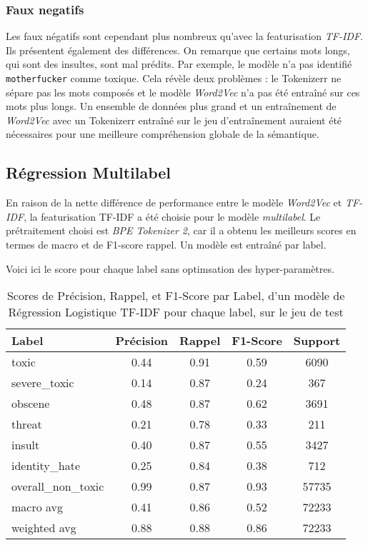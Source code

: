 \subsubsection{Faux negatifs}
Les faux négatifs sont cependant plus nombreux qu'avec la featurisation \textit{TF-IDF}. 
Ils présentent également des différences. On remarque que certains mots longs, qui sont des insultes, sont mal prédits. 
Par exemple, le modèle n'a pas identifié \texttt{motherfucker} comme toxique. 
Cela révèle deux problèmes : le Tokenizerr ne sépare pas les mots composés et le modèle \textit{Word2Vec} n'a pas été entraîné sur ces mots plus longs. 
Un ensemble de données plus grand et un entraînement de \textit{Word2Vec} avec un Tokenizerr entraîné sur le jeu d'entraînement auraient été nécessaires pour une meilleure compréhension globale de la sémantique.

\subsection{Régression Multilabel}
En raison de la nette différence de performance entre le modèle \textit{Word2Vec} et \textit{TF-IDF}, la featurisation TF-IDF a été choisie pour le modèle \textit{multilabel}. 
Le prétraitement choisi est \textit{BPE Tokenizer 2}, car il a obtenu les meilleurs scores en termes de macro et de F1-score rappel. 
Un modèle est entraîné par label.

Voici ici le score pour chaque label sans optimsation des hyper-paramètres.
\begin{table}[ht]
    \centering
    \caption{Scores de Précision, Rappel, et F1-Score par Label, d'un modèle de Régression Logistique TF-IDF pour chaque label, sur le jeu de test}
    \begin{tabular}{lcccc}
    \hline
    \textbf{Label} & \textbf{Précision} & \textbf{Rappel} & \textbf{F1-Score} & \textbf{Support} \\ \hline
    toxic          & 0.44               & 0.91            & 0.59              & 6090             \\
    severe\_toxic  & 0.14               & 0.87            & 0.24              & 367              \\
    obscene        & 0.48               & 0.87            & 0.62              & 3691             \\
    threat         & 0.21               & 0.78            & 0.33              & 211              \\
    insult         & 0.40               & 0.87            & 0.55              & 3427             \\
    identity\_hate & 0.25               & 0.84            & 0.38              & 712              \\
    overall\_non\_toxic & 0.99           & 0.87            & 0.93              & 57735            \\\hline
    macro avg      & 0.41               & 0.86            & 0.52              & 72233            \\
    weighted avg   & 0.88               & 0.88            & 0.86              & 72233            \\
    \end{tabular}
    \label{tab:scores}
\end{table}
